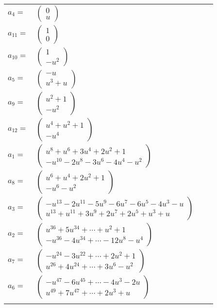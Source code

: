 \documentclass[1p]{elsarticle_modified}
\theoremstyle{definition}
\begin{document}
\begin{tabular}{m{7pt} m{180pt} m{7pt} m{180pt} }
\flushright $a_{4}=$&$\begin{pmatrix}0\\u\end{pmatrix}$ \\
\flushright $a_{11}=$&$\begin{pmatrix}1\\0\end{pmatrix}$ \\
\flushright $a_{10}=$&$\begin{pmatrix}1\\- u^2\end{pmatrix}$ \\
\flushright $a_{5}=$&$\begin{pmatrix}- u\\u^3+u\end{pmatrix}$ \\
\flushright $a_{9}=$&$\begin{pmatrix}u^2+1\\- u^2\end{pmatrix}$ \\
\flushright $a_{12}=$&$\begin{pmatrix}u^4+u^2+1\\- u^4\end{pmatrix}$ \\
\flushright $a_{1}=$&$\begin{pmatrix}u^8+u^6+3 u^4+2 u^2+1\\- u^{10}-2 u^8-3 u^6-4 u^4- u^2\end{pmatrix}$ \\
\flushright $a_{8}=$&$\begin{pmatrix}u^6+u^4+2 u^2+1\\- u^6- u^2\end{pmatrix}$ \\
\flushright $a_{3}=$&$\begin{pmatrix}- u^{13}-2 u^{11}-5 u^9-6 u^7-6 u^5-4 u^3- u\\u^{13}+u^{11}+3 u^9+2 u^7+2 u^5+u^3+u\end{pmatrix}$ \\
\flushright $a_{2}=$&$\begin{pmatrix}u^{36}+5 u^{34}+\cdots+u^2+1\\- u^{36}-4 u^{34}+\cdots-12 u^8- u^4\end{pmatrix}$ \\
\flushright $a_{7}=$&$\begin{pmatrix}- u^{24}-3 u^{22}+\cdots+2 u^2+1\\u^{26}+4 u^{24}+\cdots+3 u^6- u^2\end{pmatrix}$ \\
\flushright $a_{6}=$&$\begin{pmatrix}- u^{47}-6 u^{45}+\cdots-4 u^3-2 u\\u^{49}+7 u^{47}+\cdots+2 u^3+u\end{pmatrix}$\\&\end{tabular}
\end{document}
